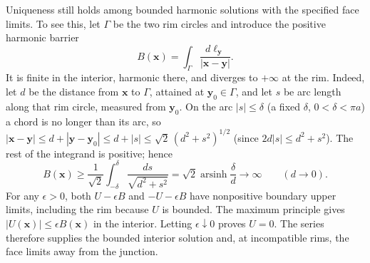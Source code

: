  Uniqueness still holds among bounded
harmonic solutions with the specified face limits. To see this,
let $\Gamma$ be the two rim circles and introduce the positive
harmonic barrier
\[
B(\mathbf x)=\int_\Gamma\frac{d\ell_{\mathbf y}}{|\mathbf x-\mathbf y|}.
\]
It is finite in the interior, harmonic there, and diverges to
$+\infty$ at the rim. Indeed, let $d$ be the distance from $\mathbf x$
to $\Gamma$, attained at $\mathbf y_0\in\Gamma$, and let $s$ be arc
length along that rim circle, measured from $\mathbf y_0$. On the arc
$|s|\le\delta$ (a fixed $\delta$, $0<\delta<\pi a$) a chord is no
longer than its arc, so
$|\mathbf x-\mathbf y|\le d+|\mathbf y-\mathbf y_0|\le d+|s|
\le\sqrt2\,(d^2+s^2)^{1/2}$ (since $2d|s|\le d^2+s^2$). The rest of
the integrand is positive; hence
\[
B(\mathbf x)\ge\frac1{\sqrt2}\int_{-\delta}^{\delta}
\frac{ds}{\sqrt{d^2+s^2}}
=\sqrt2\operatorname{arsinh}\frac\delta d\longrightarrow\infty
\qquad(d\to0).
\]
For any $\epsilon>0$, both $U-\epsilon B$ and
$-U-\epsilon B$ have nonpositive boundary upper limits, including
the rim because $U$ is bounded. The maximum principle gives
$|U(\mathbf x)|\le\epsilon B(\mathbf x)$ in the interior.
Letting $\epsilon\downarrow0$ proves $U=0$.
The series therefore supplies the bounded interior solution and,
at incompatible rims, the face limits away from the junction.

